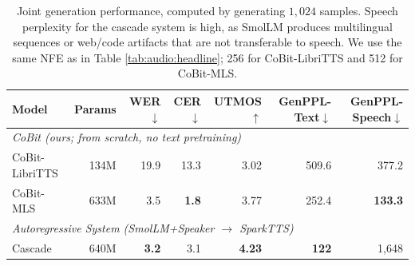 \begin{table}[t]
\centering
\small
\setlength{\tabcolsep}{4.5pt}
\begin{tabular}{lrrrrrr}
\toprule
\textbf{Model} & \textbf{Params} & \textbf{WER}$\downarrow$ & \textbf{CER}$\downarrow$ & \textbf{UTMOS}$\uparrow$ & \textbf{GenPPL-Text}$\downarrow$ & \textbf{GenPPL-Speech}$\downarrow$ \\
\midrule
\multicolumn{7}{l}{\emph{CoBit (ours; from scratch, no text pretraining)}} \\
CoBit-LibriTTS & 134M & 19.9 & 13.3 & 3.02 & 509.6 & 377.2 \\
CoBit-MLS & 633M & 3.5 & \textbf{1.8} & 3.77 & 252.4 & \textbf{133.3} \\
\midrule
\multicolumn{7}{l}{\emph{Autoregressive System (SmolLM+Speaker $\rightarrow$ SparkTTS)}} \\
Cascade & 640M & \textbf{3.2} & 3.1 & \textbf{4.23} & \textbf{122} & 1{,}648 \\
\bottomrule
\end{tabular}
\caption{Joint generation performance, computed by generating $1,024$ samples. Speech perplexity for the cascade system is high, as SmolLM produces multilingual sequences or web/code artifacts that are not transferable to speech. We use the same NFE as in Table \ref{tab:audio:headline}; 256 for CoBit-LibriTTS and 512 for CoBit-MLS.}
\label{tab:audio:joint}
\end{table}

